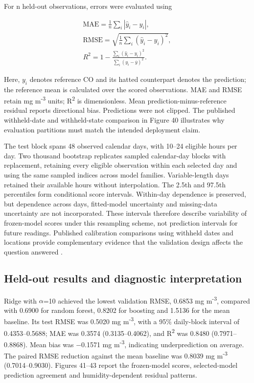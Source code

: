 \documentclass[11pt,a4paper]{article}
\begin{document}

For n held-out observations, errors were evaluated using

\begin{equation}
\label{eq:18}
\begin{gathered}
\mathrm{MAE}=\frac1n\sum_i|\widehat y_i-y_i|, \\ \mathrm{RMSE}=\sqrt{\frac1n\sum_i(\widehat y_i-y_i)^2}, \\ R^2=1-\frac{\sum_i(\widehat y_i-y_i)^2}{\sum_i(y_i-\overline y)^2}.
\end{gathered}
\end{equation}

Here, \(y_{i}\) denotes reference CO and its hatted counterpart denotes the prediction; the reference mean is calculated over the scored observations. MAE and RMSE retain mg m\textsuperscript{-3} units; R\textsuperscript{2} is dimensionless. Mean prediction-minus-reference residual reports directional bias. Predictions were not clipped. The published withheld-date and withheld-state comparison in Figure 40 illustrates why evaluation partitions must match the intended deployment claim.

The test block spans 48 observed calendar days, with 10--24 eligible hours per day. Two thousand bootstrap replicates sampled calendar-day blocks with replacement, retaining every eligible observation within each selected day and using the same sampled indices across model families. Variable-length days retained their available hours without interpolation. The 2.5th and 97.5th percentiles form conditional score intervals. Within-day dependence is preserved, but dependence across days, fitted-model uncertainty and missing-data uncertainty are not incorporated. These intervals therefore describe variability of frozen-model scores under this resampling scheme, not prediction intervals for future readings. Published calibration comparisons using withheld dates and locations provide complementary evidence that the validation design affects the question answered \citep{barkjohn2021_7ba5aa}.

\FloatBarrier

\subsection{Held-out results and diagnostic interpretation}\label{sec:10.4}

Ridge with \ensuremath{\alpha}=10 achieved the lowest validation RMSE, 0.6853 mg m\textsuperscript{-3}, compared with 0.6900 for random forest, 0.8202 for boosting and 1.5136 for the mean baseline. Its test RMSE was 0.5020 mg m\textsuperscript{-3}, with a 95\% daily-block interval of 0.4353--0.5688; MAE was 0.3574 (0.3135--0.4062), and R\textsuperscript{2} was 0.8480 (0.7971--0.8868). Mean bias was \ensuremath{-}0.1571 mg m\textsuperscript{-3}, indicating underprediction on average. The paired RMSE reduction against the mean baseline was 0.8039 mg m\textsuperscript{-3} (0.7014--0.9030). Figures 41--43 report the frozen-model scores, selected-model prediction agreement and humidity-dependent residual patterns.
\end{document}

